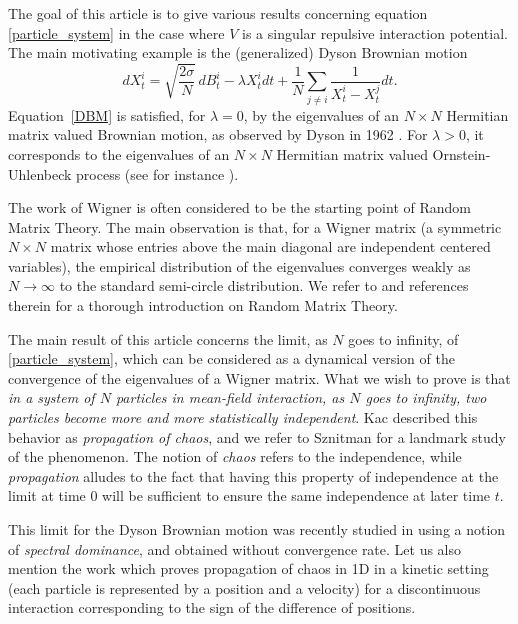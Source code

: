 \documentclass[JEP,XML,SOM,Unicode,published]{cedram}
\theoremstyle{plain}
\theoremstyle{definition}
\begin{document}
The goal of this article is to give various results concerning equation \eqref{particle_system} in the case where $V$ is a singular repulsive interaction potential. The main motivating example is the (generalized) Dyson Brownian motion\vspace*{-3pt}
\begin{equation}\label{DBM}
dX^i_t=\sqrt{\frac{2\sigma}{N}}\,dB^i_t-\lambda X^i_tdt+\frac{1}{N}\sum_{j\neq i}\frac{1}{X^i_t-X^j_t}dt.
\end{equation}
Equation~\eqref{DBM} is satisfied, for $\lambda=0$, by the eigenvalues of an $N\times N$ Hermitian matrix valued Brownian motion, as observed by Dyson in 1962 \cite{Dyson}. For $\lambda>0$, it corresponds to the eigenvalues of an $N\times N$ Hermitian matrix valued Ornstein-Uhlenbeck process (see for instance \cite{Chan92, Rogers_Shi}).

The work of Wigner \cite{Wigner} is often considered to be the starting point of Random Matrix Theory. The main observation is that, for a Wigner matrix (a symmetric $N\times N$ matrix whose entries above the main diagonal are independent centered variables), the empirical distribution of the eigenvalues converges weakly as $N\to\infty$ to the standard semi-circle distribution. We refer to \cite{anderson_guionnet_zeitouni_2009} and references therein for a thorough introduction on Random Matrix Theory.

The main result of this article concerns the limit, as $N$ goes to infinity, of \eqref{particle_system}, which can be considered as a dynamical version of the convergence of the eigenvalues of a Wigner matrix. What we wish to prove is that \textit{in a system of $N$ particles in mean-field interaction, as $N$ goes to infinity, two particles become more and more statistically independent}. Kac \cite{kac1956} described this behavior as \textit{propagation of chaos}, and we refer to Sznitman \cite{Saint_Flour_1991} for a landmark study of the phenomenon. The notion of \textit{chaos} refers to the independence, while \textit{propagation} alludes to the fact that having this property of independence at the limit at time $0$ will be sufficient to ensure the same independence at later time $t$.

This limit for the Dyson Brownian motion was recently studied in \cite{BDLL21} using a notion of \textit{spectral dominance}, and obtained without convergence rate. Let us also mention the work \cite{HS19} which proves propagation of chaos in 1D in a kinetic setting (\ie each particle is represented by a position and a velocity) for a discontinuous interaction corresponding to the sign of the difference of positions.
\end{document}
